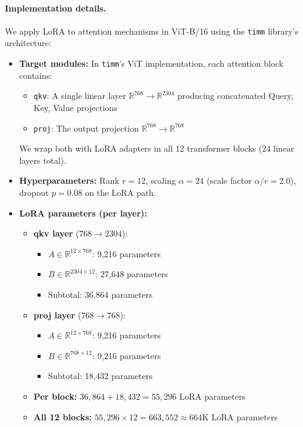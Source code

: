 \documentclass[11pt]{article}
\begin{document}
\paragraph{Implementation details.}
We apply LoRA to attention mechanisms in ViT-B/16 using the \texttt{timm} library's architecture:

\begin{itemize}
    \item \textbf{Target modules:} In \texttt{timm}'s ViT implementation, each attention block contains:
        \begin{itemize}
            \item \texttt{qkv}: A single linear layer $\mathbb{R}^{768} \to \mathbb{R}^{2304}$ producing concatenated Query, Key, Value projections
            \item \texttt{proj}: The output projection $\mathbb{R}^{768} \to \mathbb{R}^{768}$
        \end{itemize}
        We wrap both with LoRA adapters in all 12 transformer blocks (24 linear layers total).

    \item \textbf{Hyperparameters:} Rank $r=12$, scaling $\alpha=24$ (scale factor $\alpha/r = 2.0$), dropout $p=0.08$ on the LoRA path.

    \item \textbf{LoRA parameters (per layer):}
        \begin{itemize}
            \item \textbf{qkv layer} ($768 \to 2304$):
                \begin{itemize}
                    \item $A \in \mathbb{R}^{12 \times 768}$: 9,216 parameters
                    \item $B \in \mathbb{R}^{2304 \times 12}$: 27,648 parameters
                    \item Subtotal: 36,864 parameters
                \end{itemize}
            \item \textbf{proj layer} ($768 \to 768$):
                \begin{itemize}
                    \item $A \in \mathbb{R}^{12 \times 768}$: 9,216 parameters
                    \item $B \in \mathbb{R}^{768 \times 12}$: 9,216 parameters
                    \item Subtotal: 18,432 parameters
                \end{itemize}
            \item \textbf{Per block:} $36{,}864 + 18{,}432 = 55{,}296$ LoRA parameters
            \item \textbf{All 12 blocks:} $55{,}296 \times 12 = 663{,}552 \approx 664\text{K}$ LoRA parameters
        \end{itemize}
\end{itemize}
\end{document}
